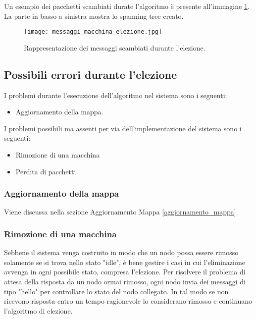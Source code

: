 Un esempio dei pacchetti scambiati durate l'algoritmo è presente all'immagine \ref{fig:messaggi_macchina_elezione}. La parte in basso a sinistra mostra lo spanning tree creato.

\begin{figure}[htbp]
	\centering
	\texttt{[image: messaggi\_macchina\_elezione.jpg]}
	\caption{Rappresentazione dei messaggi scambiati durante l'elezione.}
	\label{fig:messaggi_macchina_elezione}
\end{figure}

\newpage

\subsection{Possibili errori durante l'elezione}

I problemi durante l'esecuzione dell'algoritmo nel sistema sono i seguenti:
\begin{itemize}
	\item Aggiornamento della mappa.
\end{itemize}

I problemi possibili ma assenti per via dell'implementazione del sistema sono i seguenti:
\begin{itemize}
	\item Rimozione di una macchina
	\item Perdita di pacchetti
\end{itemize}

\subsubsection{Aggiornamento della mappa}
Viene discussa nella sezione Aggiornamento Mappa \ref{aggiornamento_mappa}.

\subsubsection{Rimozione di una macchina}
Sebbene il sistema venga costruito in modo che un nodo possa essere rimosso solamente se si trova nello stato "idle", è bene gestire i casi in cui l'eliminazione avvenga in ogni possibile stato, compresa l'elezione. Per risolvere il problema di attesa della risposta da un nodo ormai rimosso, ogni nodo invia dei messaggi di tipo "hello" per controllare lo stato del nodo collegato. In tal modo se non ricevono risposta entro un tempo ragionevole lo considerano rimosso e continuano l'algoritmo di elezione.

